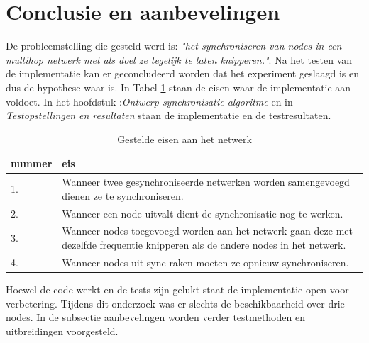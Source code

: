 \documentclass{article}
\begin{document}
\section{Conclusie en aanbevelingen}
De probleemstelling die gesteld werd is: \textit{"het synchroniseren van nodes in een multihop netwerk met als doel ze tegelijk te laten knipperen."}. Na het testen van de implementatie kan er geconcludeerd worden dat het experiment geslaagd is en dus de hypothese waar is. In Tabel \ref{tab: Gestelde eisen} staan de eisen waar de implementatie aan voldoet. In het hoofdstuk :\textit{Ontwerp synchronisatie-algoritme} en in \textit{Testopstellingen en resultaten} staan de implementatie en de testresultaten. 
\begin{table}[h]
	\centering\caption{Gestelde eisen aan het netwerk}
	\label{tab: Gestelde eisen}
	\begin{tabular}{|l|p{10cm}|}\hline
	\textbf{nummer} & \textbf{eis} \\ \hline
	1. & Wanneer twee gesynchroniseerde netwerken worden samengevoegd 
	dienen ze te synchroniseren. \\ \hline
	2. & Wanneer een node uitvalt dient de synchronisatie 
	nog te werken. \\ \hline
	3. & Wanneer nodes toegevoegd worden aan het netwerk gaan deze met dezelfde
	 frequentie knipperen als de andere nodes in het netwerk.\\ \hline
	4. & Wanneer nodes uit sync raken moeten ze opnieuw synchroniseren. \\ \hline
	\end{tabular}
\end{table}
\newline
Hoewel de code werkt en de tests zijn gelukt staat de implementatie open voor verbetering. Tijdens dit onderzoek was er slechts de beschikbaarheid over drie nodes. In de subsectie aanbevelingen worden verder testmethoden en uitbreidingen voorgesteld. 
\end{document}
